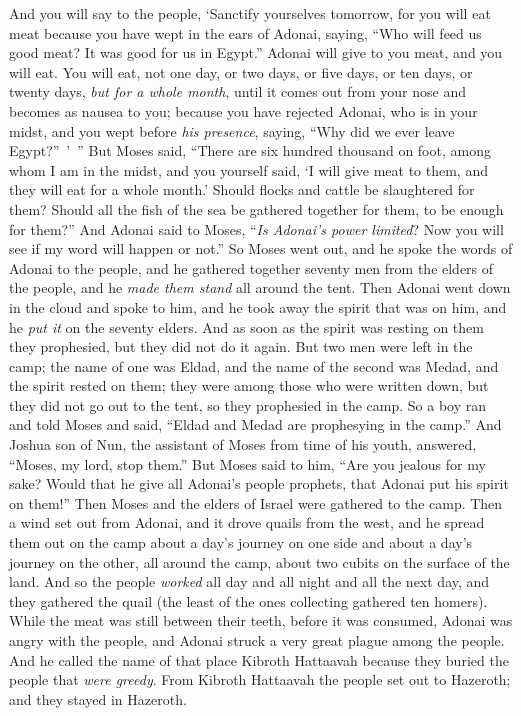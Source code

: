 \begin{biblechapter}
\verse And you will say to the people, ‘Sanctify yourselves tomorrow, for you will eat meat because you have wept in the ears of Adonai, saying, “Who will feed us good meat? It was good for us in Egypt.” Adonai will give to you meat, and you will eat.
\verse You will eat, not one day, or two days, or five days, or ten days, or twenty days,
\verse \textit{but for a whole month}, until it comes out from your nose and becomes as nausea to you; because you have rejected Adonai, who is in your midst, and you wept before \textit{his presence}, saying, “Why did we ever leave Egypt?” ’ ”
\verse But Moses said, “There are six hundred thousand on foot, among whom I am in the midst, and you yourself said, ‘I will give meat to them, and they will eat for a whole month.’
\verse Should flocks and cattle be slaughtered for them? Should all the fish of the sea be gathered together for them, to be enough for them?”
\verse And Adonai said to Moses, “\textit{Is Adonai’s power limited}? Now you will see if my word will happen or not.”
\verse So Moses went out, and he spoke the words of Adonai to the people, and he gathered together seventy men from the elders of the people, and he \textit{made them stand} all around the tent.
\verse Then Adonai went down in the cloud and spoke to him, and he took away the spirit that was on him, and he \textit{put it} on the seventy elders. And as soon as the spirit was resting on them they prophesied, but they did not do it again.
\verse But two men were left in the camp; the name of one was Eldad, and the name of the second was Medad, and the spirit rested on them; they were among those who were written down, but they did not go out to the tent, so they prophesied in the camp.
\verse So a boy ran and told Moses and said, “Eldad and Medad are prophesying in the camp.”
\verse And Joshua son of Nun, the assistant of Moses from time of his youth, answered, “Moses, my lord, stop them.”
\verse But Moses said to him, “Are you jealous for my sake? Would that he give all Adonai’s people prophets, that Adonai put his spirit on them!”
\verse Then Moses and the elders of Israel were gathered to the camp.
 Then a wind set out from Adonai, and it drove quails from the west, and he spread them out on the camp about a day’s journey on one side and about a day’s journey on the other, all around the camp, about two cubits on the surface of the land.
\verse And so the people \textit{worked} all day and all night and all the next day, and they gathered the quail (the least of the ones collecting gathered ten homers).
\verse While the meat was still between their teeth, before it was consumed, Adonai was angry with the people, and Adonai struck a very great plague among the people.
\verse And he called the name of that place Kibroth Hattaavah because they buried the people that \textit{were greedy}.
\verse From Kibroth Hattaavah the people set out to Hazeroth; and they stayed in Hazeroth.
\end{biblechapter}

